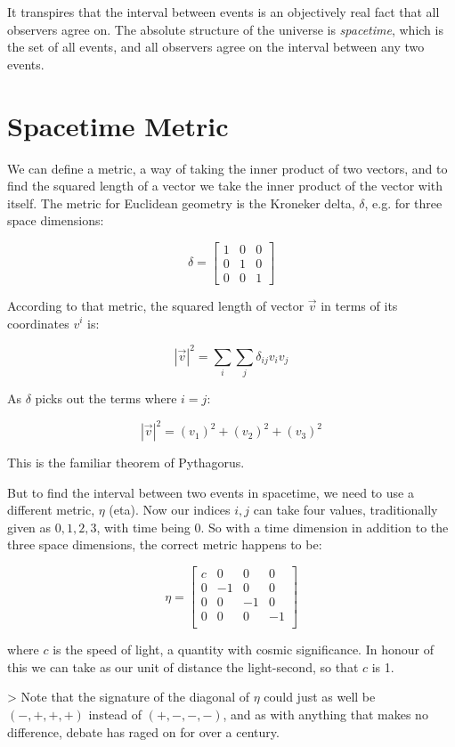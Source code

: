 It transpires that the interval between events is an objectively real fact that all observers agree on. The absolute structure of the universe is \textit{spacetime}, which is the set of all events, and all observers agree on the interval between any two events.

\section{Spacetime Metric}

We can define a metric, a way of taking the inner product of two vectors, and to find the squared length of a vector we take the inner product of the vector with itself. The metric for Euclidean geometry is the Kroneker delta, $\delta$, e.g. for three space dimensions:

$$
\delta =
\begin{bmatrix}
1 & 0 & 0 \\
0 & 1 & 0 \\
0 & 0 & 1
\end{bmatrix}
$$

According to that metric, the squared length of vector $\vec{v}$ in terms of its coordinates $v^i$ is:

$$|\vec{v}|^2 = \sum_i \sum_j \delta_{ij}v_iv_j$$

As $\delta$ picks out the terms where $i = j$:

$$|\vec{v}|^2 = (v_1)^2 + (v_2)^2 + (v_3)^2$$

This is the familiar theorem of Pythagorus.

But to find the interval between two events in spacetime, we need to use a different metric, $\eta$ (eta). Now our indices $i, j$ can take four values, traditionally given as $0, 1, 2, 3$, with time being $0$. So with a time dimension in addition to the three space dimensions, the correct metric happens to be:

$$
\eta =
\begin{bmatrix}
c & 0 & 0 & 0 \\
0 & -1 & 0 & 0 \\
0 & 0 & -1 & 0 \\
0 & 0 & 0 & -1 \\
\end{bmatrix}
$$

where $c$ is the speed of light, a quantity with cosmic significance. In honour of this we can take as our unit of distance the light-second, so that $c$ is 1.

> Note that the signature of the diagonal of $\eta$ could just as well be $(-, +, +, +)$ instead of $(+, -, -, -)$, and as with anything that makes no difference, debate has raged on for over a century.


